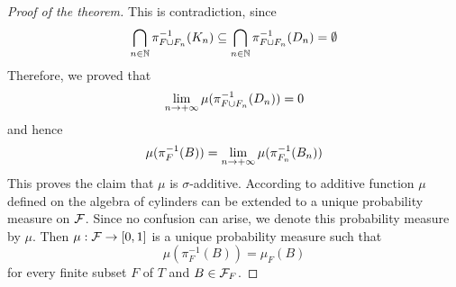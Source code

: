 \documentclass[10pt]{amsart}
\begin{document}
\begin{proof}[Proof of the theorem]
	This is contradiction, since
	$$\bigcap_{n\in {\mathbb N}}\pi^{-1}_{F\cup F_n}(K_n) \subseteq \bigcap_{n\in {\mathbb N}}\pi^{-1}_{F\cup F_n}(D_n) = \emptyset$$
	Therefore, we proved that
	$$\lim_{n\rightarrow +\infty}\mu(\pi^{-1}_{F\cup F_n}(D_n)) = 0$$
	and hence
	$$\mu(\pi_F^{-1}(B)) = \lim_{n\rightarrow +\infty}\mu(\pi^{-1}_{F_n}(B_n))$$
	This proves the claim that $\mu$ is $\sigma$-additive. According to {\cite[Theorem 3.3]{Introduction_to_measure_theory}} additive function $\mu$ defined on the algebra of cylinders can be extended to a unique probability measure on ${\mathcal F}$. Since no confusion can arise, we denote this probability measure by $\mu$. Then $\mu:{\mathcal F}\rightarrow [0,1]$ is a unique probability measure such that
	$$\mu\left(\pi^{-1}_F(B)\right) = \mu_F(B)$$
	for every finite subset $F$ of $T$ and $B\in {\mathcal F}_F$.
\end{proof}


\small


\end{document}
